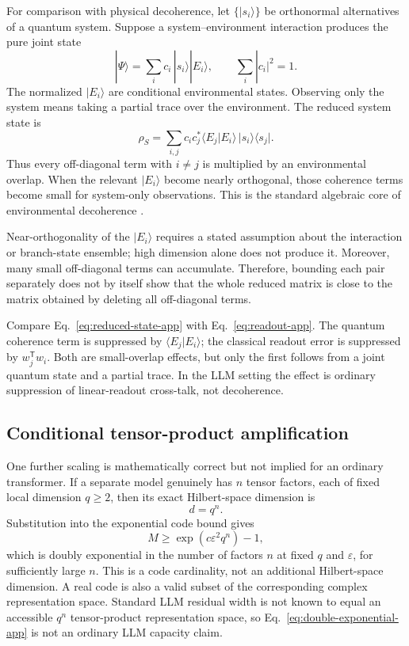 \documentclass[
  aps,
  reprint,
  superscriptaddress,
  floatfix,
  nofootinbib,
  longbibliography
]{revtex4-2}
\newcommand{\T}{^{\mathsf T}}
\begin{document}
For comparison with physical decoherence, let
$\{|s_i\rangle\}$ be orthonormal alternatives of a quantum system.  Suppose a
system--environment interaction produces the pure joint state
\begin{equation}
 |\Psi\rangle=\sum_i c_i\,|s_i\rangle|E_i\rangle,
 \qquad \sum_i|c_i|^2=1.
 \label{eq:branch-state-app}
\end{equation}
The normalized $|E_i\rangle$ are conditional environmental states.  Observing
only the system means taking a partial trace over the environment.  The
reduced system state is
\begin{equation}
 \rho_S
 =\sum_{i,j}c_i c_j^*
 \langle E_j|E_i\rangle\,|s_i\rangle\langle s_j|.
 \label{eq:reduced-state-app}
\end{equation}
Thus every off-diagonal term with $i\ne j$ is multiplied by an environmental
overlap.  When the relevant $|E_i\rangle$ become nearly orthogonal, those
coherence terms become small for system-only observations.  This is the
standard algebraic core of environmental decoherence
\cite{RevModPhys.75.715}.

Near-orthogonality of the $|E_i\rangle$ requires a stated assumption about the
interaction or branch-state ensemble; high dimension alone does not produce
it.  Moreover, many small off-diagonal terms can accumulate.  Therefore,
bounding each pair separately does not by itself show that the whole reduced
matrix is close to the matrix obtained by deleting all off-diagonal terms.

Compare Eq.~\eqref{eq:reduced-state-app} with
Eq.~\eqref{eq:readout-app}.  The quantum coherence term is suppressed by
$\langle E_j|E_i\rangle$; the classical readout error is suppressed by
$w_j\T w_i$.  Both are small-overlap effects, but only the first follows from
a joint quantum state and a partial trace.  In the LLM setting the effect is
ordinary suppression of linear-readout cross-talk, not decoherence.

\subsection{Conditional tensor-product amplification}

One further scaling is mathematically correct but not implied for an ordinary
transformer.  If a separate model genuinely has $n$ tensor factors, each of
fixed local dimension $q\geq2$, then its exact Hilbert-space dimension is
\begin{equation}
 d=q^n.
 \label{eq:tensor-dimension-app}
\end{equation}
Substitution into the exponential code bound gives
\begin{equation}
 M\geq\exp(c\varepsilon^2q^n)-1,
 \label{eq:double-exponential-app}
\end{equation}
which is doubly exponential in the number of factors $n$ at fixed $q$ and
$\varepsilon$, for sufficiently large $n$.  This is a code cardinality, not
an additional Hilbert-space dimension.  A real code is also a valid subset of
the corresponding complex representation space.  Standard LLM residual width
is not known to equal an accessible $q^n$ tensor-product representation space, so
Eq.~\eqref{eq:double-exponential-app} is not an ordinary LLM capacity claim.
\end{document}
